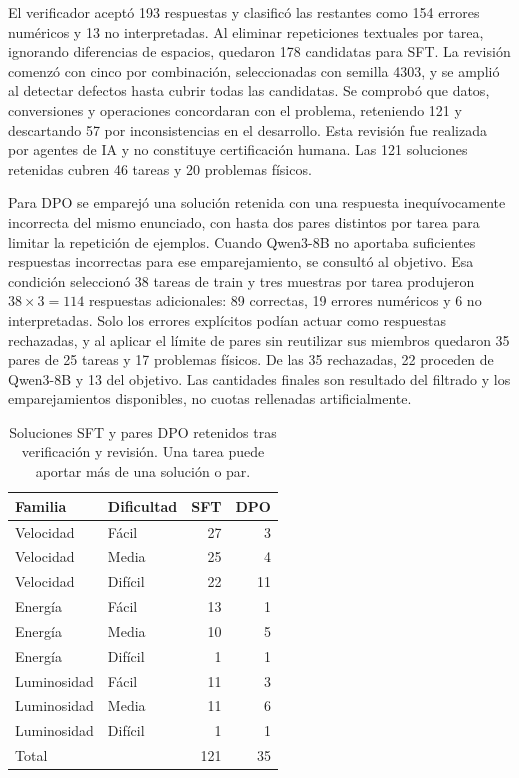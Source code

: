 El verificador aceptó 193 respuestas y clasificó las restantes como 154 errores
numéricos y 13 no interpretadas. Al eliminar repeticiones textuales por tarea,
ignorando diferencias de espacios, quedaron 178 candidatas para SFT. La revisión
comenzó con cinco por combinación, seleccionadas con semilla 4303, y se amplió
al detectar defectos hasta cubrir todas las candidatas. Se comprobó que datos,
conversiones y operaciones concordaran con el problema, reteniendo 121 y
descartando 57 por inconsistencias en el desarrollo. Esta revisión fue realizada
por agentes de IA y no constituye certificación humana. Las 121 soluciones
retenidas cubren 46 tareas y 20 problemas físicos.

Para DPO se emparejó una solución retenida con una respuesta inequívocamente
incorrecta del mismo enunciado, con hasta dos pares distintos por tarea para
limitar la repetición de ejemplos. Cuando Qwen3-8B no aportaba suficientes
respuestas incorrectas para ese emparejamiento, se consultó al objetivo. Esa
condición seleccionó 38 tareas de train y tres muestras por tarea produjeron
$38\times3=114$ respuestas adicionales: 89 correctas, 19 errores numéricos y
6 no interpretadas. Solo los errores explícitos podían actuar como respuestas
rechazadas, y al aplicar el límite de pares sin reutilizar sus miembros quedaron
35 pares de 25 tareas y 17 problemas físicos. De las 35 rechazadas, 22 proceden
de Qwen3-8B y 13 del objetivo. Las cantidades finales son resultado del
filtrado y los emparejamientos disponibles, no cuotas rellenadas artificialmente.

\begin{table}[ht]
\centering
\begin{tabular}{llrr}
Familia & Dificultad & SFT & DPO \\
\midrule
Velocidad & Fácil & 27 & 3 \\
Velocidad & Media & 25 & 4 \\
Velocidad & Difícil & 22 & 11 \\
Energía & Fácil & 13 & 1 \\
Energía & Media & 10 & 5 \\
Energía & Difícil & 1 & 1 \\
Luminosidad & Fácil & 11 & 3 \\
Luminosidad & Media & 11 & 6 \\
Luminosidad & Difícil & 1 & 1 \\
\midrule
Total & & 121 & 35 \\
\end{tabular}
\caption{Soluciones SFT y pares DPO retenidos tras verificación y revisión.
Una tarea puede aportar más de una solución o par.}
\end{table}

